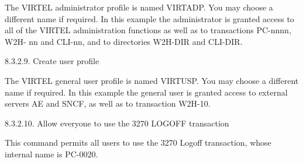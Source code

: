 \documentclass[letterpaper,10pt,english]{sphinxmanual}
\begin{document}

The VIRTEL administrator profile is named VIRTADP. You may choose a different name if required. In this example the administrator is granted access to all of the VIRTEL administration functions as well as to transactions PC-nnnn, W2H- nn and CLI-nn, and to directories W2H-DIR and CLI-DIR.

8.3.2.9. Create user profile

\begin{sphinxVerbatim}[commandchars=\\\{\}]
   
         
  
  
  
  
\end{sphinxVerbatim}


The VIRTEL general user profile is named VIRTUSP. You may choose a different name if required. In this example the general user is granted access to external servers AE and SNCF, as well as to transaction W2H-10.

8.3.2.10. Allow everyone to use the 3270 LOGOFF transaction

\begin{sphinxVerbatim}[commandchars=\\\{\}]
  
\end{sphinxVerbatim}


This command permits all users to use the 3270 Logoff transaction, whose internal name is PC-0020.
\end{document}
